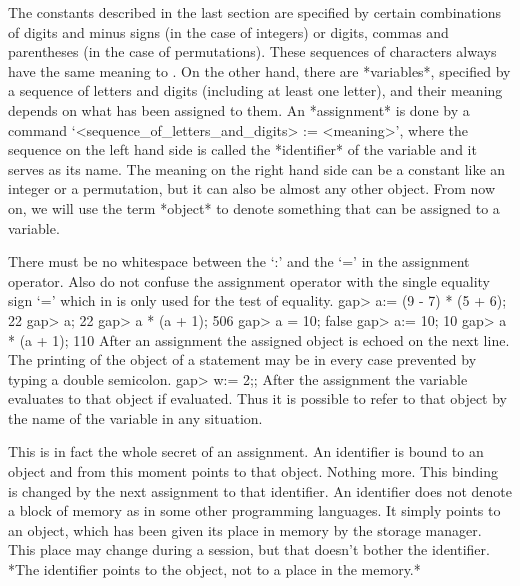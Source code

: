\null

%
%
The  constants described  in the  last  section are  specified by certain
combinations   of digits and  minus  signs (in  the case  of integers) or
digits,  commas  and parentheses  (in   the case  of permutations). These
sequences of characters always  have the same meaning  to {\GAP}.  On the
other hand, there are *variables*, specified by a sequence of letters and
digits (including at least one letter), and their meaning depends on what
has been  assigned to them.  An *assignment* is  done by a {\GAP} command
`<sequence_of_letters_and_digits> := <meaning>',  where the  sequence  on
the left hand side is called the *identifier*  of the variable and it serves
as its name. The meaning on the right hand side can be a constant like an
integer or  a  permutation, but  it can  also be almost  any other {\GAP}
object. From now on,  we will use the  term *object* to denote  something
that can be assigned to a variable.

There must be no whitespace between the `:' and the `=' in the assignment
operator.  Also do not confuse  the  assignment operator with the  single
equality sign `=' which in {\GAP} is only used for the test of equality.
\beginexample
gap> a:= (9 - 7) * (5 + 6);
22
gap> a;
22
gap> a * (a + 1);
506
gap> a = 10;
false
gap> a:= 10;
10
gap> a * (a + 1);
110 
\endexample
After an assignment the assigned object is echoed on the  next line.  The
printing of the  object of a statement may  be in every case prevented by
typing a double semicolon.
\beginexample
gap> w:= 2;; 
\endexample
After the assignment the variable evaluates  to that object if evaluated.
Thus it is possible to  refer to that object by  the name of the variable
in any situation.

This is in fact the whole secret of an assignment. An identifier is bound
to an  object and from this moment  points to that object.  Nothing more.
This binding  is changed by the  next  assignment to that  identifier. An
identifier does not denote a block of memory as in some other programming
languages. It simply points to an object, which has  been given its place
in memory by the {\GAP} storage manager.   This place may change during a
{\GAP} session, but that doesn't  bother the identifier.  *The identifier
points to the object, not to a place in the memory.*

